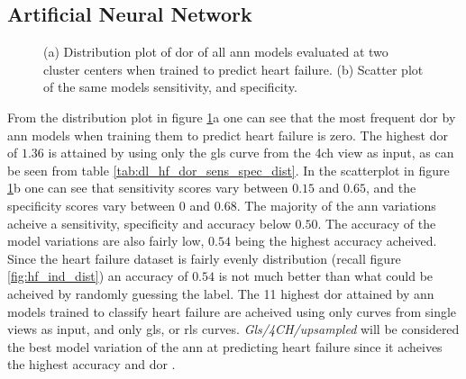 \clearpage

\subsection{Artificial Neural Network}

\begin{figure}[H]
    \centering
    
    \caption{(a) Distribution plot of \acrshort{dor} of all \acrshort{ann} models evaluated at two cluster centers when trained to predict heart failure.
             (b) Scatter plot of the same models sensitivity, and specificity.}
    \label{fig:dl_hf_dor_sens_spec_dist}
\end{figure}

From the distribution plot in figure \ref{fig:dl_hf_dor_sens_spec_dist}a one can see that the most frequent \acrshort{dor} by \acrshort{ann} models when training them to predict heart failure is zero. The highest \acrshort{dor} of $1.36$ is attained by using only the \acrshort{gls} curve from the \acrshort{4ch} view as input, as can be seen from table \ref{tab:dl_hf_dor_sens_spec_dist}. In the scatterplot in figure \ref{fig:dl_hf_dor_sens_spec_dist}b one can see that sensitivity scores vary between $0.15$ and $0.65$, and the specificity scores vary between $0$ and $0.68$. The majority of the \acrshort{ann} variations acheive a sensitivity, specificity and accuracy below $0.50$. The accuracy of the model variations are also fairly low, $0.54$ being the highest accuracy acheived. Since the heart failure dataset is fairly evenly distribution (recall figure \ref{fig:hf_ind_dist}) an accuracy of $0.54$ is not much better than what could be acheived by randomly guessing the label. The 11 highest \acrshort{dor} attained by \acrshort{ann} models trained to classify heart failure are acheived using only curves from single views as input, and only \acrshort{gls}, or \acrshort{rls} curves. \textit{Gls/4CH/upsampled} will be considered the best model variation of the \acrshort{ann} at predicting heart failure since it acheives the highest accuracy and \acrshort{dor} . \bigskip

